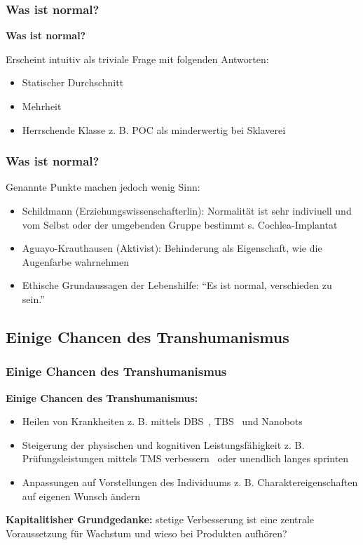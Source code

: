 \documentclass[aspectratio=169,16pt,xcolor=table]{beamer}
\begin{document}
\begin{frame}
	\frametitle{Was ist normal?}
  \textbf{Was ist normal?}

  \vspace{12pt}
  \small Erscheint intuitiv als triviale Frage mit folgenden Antworten:
	\begin{itemize}
	  \item Statischer Durchschnitt
	  \item Mehrheit
	  \item Herrschende Klasse z. B. POC als minderwertig bei Sklaverei
  \end{itemize}
\end{frame}

\begin{frame}
	\frametitle{Was ist normal?}
  \small Genannte Punkte machen jedoch wenig Sinn: 
	\begin{itemize}
	  \item Schildmann (Erziehungswissenschafterlin): Normalität ist sehr indiviuell und vom Selbst oder der umgebenden Gruppe bestimmt s. Cochlea-Implantat~\cite{schildmann1999normal}
	  \item Aguayo-Krauthausen (Aktivist): Behinderung als Eigenschaft, wie die Augenfarbe wahrnehmen~\cite{aguayo2023inklusion}
	  \item Ethische Grundaussagen der Lebenshilfe: ``Es ist normal, verschieden zu sein.''~\cite{lebenshilfeFlyer}
  \end{itemize}
\end{frame}

\subsection{Einige Chancen des Transhumanismus}
\begin{frame}
	\frametitle{Einige Chancen des Transhumanismus}
  \textbf{Einige Chancen des Transhumanismus:}
	\begin{itemize}
    \item Heilen von Krankheiten z. B. mittels DBS~\cite{perlmutter2006deep}, TBS~\cite{hallett2007transcranial} und Nanobots~\cite{wang2022intelligent}
    \item Steigerung der physischen und kognitiven Leistungsfähigkeit z. B. Prüfungsleistungen mittels TMS verbessern~\cite{luber2014enhancement} oder unendlich langes sprinten~\cite{kurzweil2005singularity}
    \item Anpassungen auf Vorstellungen des Individuums z. B. Charaktereigenschaften auf eigenen Wunsch ändern~\cite{logtenberg2022beyond}\\    
  \end{itemize}
  \small \textbf{Kapitalitisher Grundgedanke:} stetige Verbesserung ist eine zentrale Voraussetzung für Wachstum und wieso bei Produkten aufhören?
\end{frame}
\end{document}
